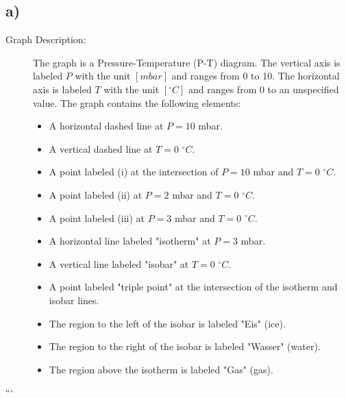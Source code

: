 

\subsection*{a)}

\begin{description}
    \item[Graph Description:] The graph is a Pressure-Temperature (P-T) diagram. The vertical axis is labeled \( P \) with the unit \([mbar]\) and ranges from 0 to 10. The horizontal axis is labeled \( T \) with the unit \([^\circ C]\) and ranges from 0 to an unspecified value. The graph contains the following elements:
    \begin{itemize}
        \item A horizontal dashed line at \( P = 10 \) mbar.
        \item A vertical dashed line at \( T = 0 \) \( ^\circ C \).
        \item A point labeled (i) at the intersection of \( P = 10 \) mbar and \( T = 0 \) \( ^\circ C \).
        \item A point labeled (ii) at \( P = 2 \) mbar and \( T = 0 \) \( ^\circ C \).
        \item A point labeled (iii) at \( P = 3 \) mbar and \( T = 0 \) \( ^\circ C \).
        \item A horizontal line labeled "isotherm" at \( P = 3 \) mbar.
        \item A vertical line labeled "isobar" at \( T = 0 \) \( ^\circ C \).
        \item A point labeled "triple point" at the intersection of the isotherm and isobar lines.
        \item The region to the left of the isobar is labeled "Eis" (ice).
        \item The region to the right of the isobar is labeled "Wasser" (water).
        \item The region above the isotherm is labeled "Gas" (gas).
    \end{itemize}
\end{description}

```